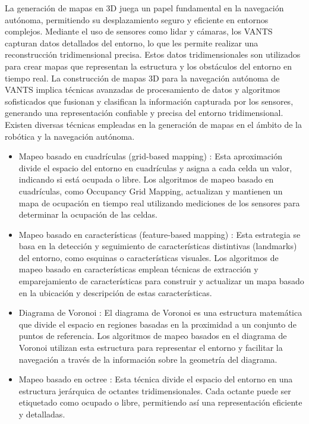 \documentclass[sigconf]{acmart}
\begin{document}
La generación de mapas en 3D juega un papel fundamental en la navegación autónoma, permitiendo su desplazamiento seguro y eficiente en entornos complejos. Mediante el uso de sensores como lidar y cámaras, los VANTS capturan datos detallados del entorno, lo que les permite realizar una reconstrucción tridimensional precisa. Estos datos tridimensionales son utilizados para crear mapas que representan la estructura y los obstáculos del entorno en tiempo real. La construcción de mapas 3D para la navegación autónoma de VANTS implica técnicas avanzadas de procesamiento de datos y algoritmos sofisticados que fusionan y clasifican la información capturada por los sensores, generando una representación confiable y precisa del entorno tridimensional. Existen diversas técnicas empleadas en la generación de mapas en el ámbito de la robótica y la navegación autónoma.

\begin{itemize}

\item Mapeo basado en cuadrículas (grid-based mapping) \cite{GridUAV}: Esta aproximación divide el espacio del entorno en cuadrículas y asigna a cada celda un valor, indicando si está ocupada o libre. Los algoritmos de mapeo basado en cuadrículas, como Occupancy Grid Mapping, actualizan y mantienen un mapa de ocupación en tiempo real utilizando mediciones de los sensores para determinar la ocupación de las celdas.

\item Mapeo basado en características (feature-based mapping) \cite{LandmarksUAV}: Esta estrategia se basa en la detección y seguimiento de características distintivas (landmarks) del entorno, como esquinas o características visuales. Los algoritmos de mapeo basado en características emplean técnicas de extracción y emparejamiento de características para construir y actualizar un mapa basado en la ubicación y descripción de estas características.

\item Diagrama de Voronoi \cite{DVoronoi}: El diagrama de Voronoi es una estructura matemática que divide el espacio en regiones basadas en la proximidad a un conjunto de puntos de referencia. Los algoritmos de mapeo basados en el diagrama de Voronoi utilizan esta estructura para representar el entorno y facilitar la navegación a través de la información sobre la geometría del diagrama.

\item Mapeo basado en octree \cite{Octree2023}: Esta técnica divide el espacio del entorno en una estructura jerárquica de octantes tridimensionales. Cada octante puede ser etiquetado como ocupado o libre, permitiendo así una representación eficiente y detalladas.
\end{itemize}
\end{document}
